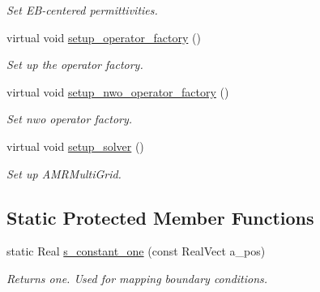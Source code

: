 \begin{DoxyCompactItemize}
\begin{DoxyCompactList}\small\item\em Set E\+B-\/centered permittivities. \end{DoxyCompactList}\item 
virtual void \hyperlink{classpoisson__multifluid__gmg_a2179f8463eb902c1ca26fdee19ce82bb}{setup\+\_\+operator\+\_\+factory} ()
\begin{DoxyCompactList}\small\item\em Set up the operator factory. \end{DoxyCompactList}\item 
virtual void \hyperlink{classpoisson__multifluid__gmg_a6f560cf7c295f9e5b50392d0bc805aaa}{setup\+\_\+nwo\+\_\+operator\+\_\+factory} ()
\begin{DoxyCompactList}\small\item\em Set nwo operator factory. \end{DoxyCompactList}\item 
virtual void \hyperlink{classpoisson__multifluid__gmg_a5875698ffa96bf0bb53d85461eadfb0d}{setup\+\_\+solver} ()
\begin{DoxyCompactList}\small\item\em Set up A\+M\+R\+Multi\+Grid. \end{DoxyCompactList}\end{DoxyCompactItemize}
\subsection*{Static Protected Member Functions}
\begin{DoxyCompactItemize}
\item 
static Real \hyperlink{classpoisson__multifluid__gmg_a98b055ba98dcc175e1654ffa35402338}{s\+\_\+constant\+\_\+one} (const Real\+Vect a\+\_\+pos)
\begin{DoxyCompactList}\small\item\em Returns one. Used for mapping boundary conditions. \end{DoxyCompactList}\end{DoxyCompactItemize}
